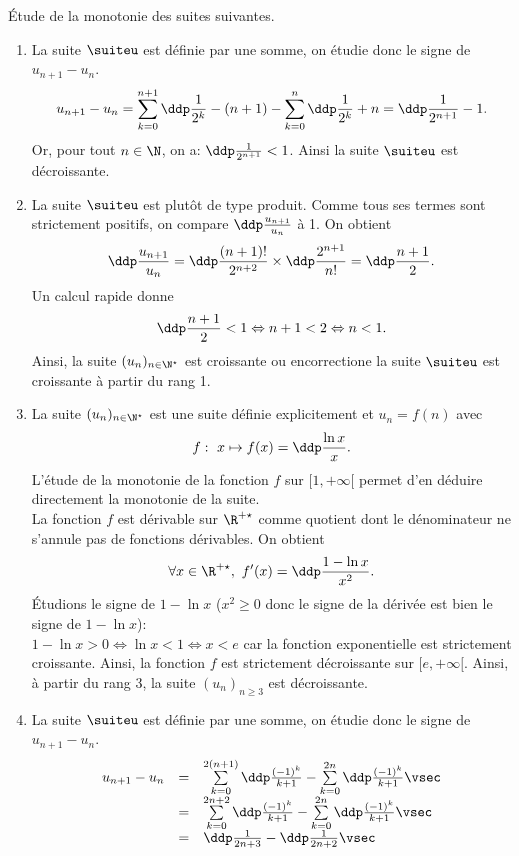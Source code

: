 \begin{correction} \;
\'Etude de la monotonie des suites suivantes.
\begin{enumerate}
 \item La suite $\suiteu$ est d\'efinie par une somme, on \'etudie donc le signe de $u_{n+1}-u_n$.
$$u_{n+1}-u_n=\sum\limits_{k=0}^{n+1}\ddp\frac{1}{2^k}-(n+1)-\sum\limits_{k=0}^{n}\ddp\frac{1}{2^k}+n=\ddp\frac{1}{2^{n+1}}-1.$$
Or, pour tout $n\in\N$, on a: $\ddp\frac{1}{2^{n+1}}<1$. Ainsi la suite $\suiteu$ est d\'ecroissante.
\item La suite $\suiteu$ est plut\^ot de type produit. Comme tous ses termes sont strictement positifs, on compare $\ddp\frac{u_{n+1}}{u_n}$ \`a 1. On obtient
$$\ddp\frac{u_{n+1}}{u_n}=\ddp\frac{(n+1)!}{2^{n+2}} \times \ddp\frac{2^{n+1}}{n!}=\ddp\frac{n+1}{2}.$$
Un calcul rapide donne
$$\ddp\frac{n+1}{2}<1\Leftrightarrow n+1<2\Leftrightarrow n<1.$$
Ainsi, la suite $(u_n)_{n\in\N^{\star}}$ est croissante ou encorrectione la suite $\suiteu$ est croissante \`{a} partir du rang 1.
\item 
La suite $(u_n)_{n\in\N^{\star}}$ est une suite d\'efinie explicitement et $u_n=f(n)$ avec
$$f:\ x\mapsto f(x)=\ddp\frac{\ln{x}}{x}.$$
L'\'etude de la monotonie de la fonction $f$ sur $\lbrack 1,+\infty\lbrack$ permet d'en d\'eduire directement la monotonie de la suite.\\
\noindent La fonction $f$ est d\'erivable sur $\R^{+\star}$ comme quotient dont le d\'enominateur ne s'annule pas de fonctions d\'erivables. On obtient
$$\forall x\in\R^{+\star},\ f^{\prime}(x)=\ddp\frac{1-\ln{x}}{x^2}.$$
\'Etudions le signe de $1-\ln{x}$ ($x^2\geq 0$ donc le signe de la d\'eriv\'ee est bien le signe de $1-\ln{x}$):\\
\noindent $1-\ln{x}>0  \Leftrightarrow  \ln{x}<1
\Leftrightarrow x<e $ car la fonction exponentielle est strictement croissante.
Ainsi, la fonction $f$ est strictement d\'ecroissante sur $\lbrack e,+\infty\lbrack$. Ainsi, \`a partir du rang 3, la suite $(u_n)_{n\geq 3}$ est d\'ecroissante.
\item La suite $\suiteu$ est d\'efinie par une somme, on \'etudie donc le signe de $u_{n+1}-u_n$.
$$\begin{array}{lll}
u_{n+1}-u_n&=&\sum\limits_{k=0}^{2(n+1)}\ddp\frac{(-1)^k}{k+1}-\sum\limits_{k=0}^{2n}\ddp\frac{(-1)^k}{k+1}\vsec\\
&=& \sum\limits_{k=0}^{2n+2}\ddp\frac{(-1)^k}{k+1}-\sum\limits_{k=0}^{2n}\ddp\frac{(-1)^k}{k+1}\vsec\\
&=& \ddp\frac{1}{2n+3}-\ddp\frac{1}{2n+2}\vsec\\

\end{array}$$
\end{enumerate}
\end{correction}

